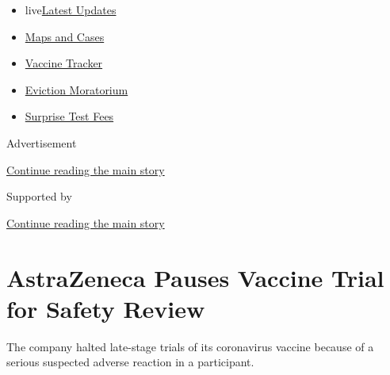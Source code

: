 \begin{itemize}
\tightlist
\item
  live\href{https://www.nytimes3xbfgragh.onion/2020/09/09/world/covid-19-coronavirus.html?name=styln-coronavirus-national\&region=TOP_BANNER\&block=storyline_menu_recirc\&action=click\&pgtype=Article\&impression_id=11ea9901-f2ae-11ea-b55f-67263e649e17\&variant=undefined}{Latest
  Updates}
\item
  \href{https://www.nytimes3xbfgragh.onion/interactive/2020/us/coronavirus-us-cases.html?name=styln-coronavirus-national\&region=TOP_BANNER\&block=storyline_menu_recirc\&action=click\&pgtype=Article\&impression_id=11eac010-f2ae-11ea-b55f-67263e649e17\&variant=undefined}{Maps
  and Cases}
\item
  \href{https://www.nytimes3xbfgragh.onion/interactive/2020/science/coronavirus-vaccine-tracker.html?name=styln-coronavirus-national\&region=TOP_BANNER\&block=storyline_menu_recirc\&action=click\&pgtype=Article\&impression_id=11eac011-f2ae-11ea-b55f-67263e649e17\&variant=undefined}{Vaccine
  Tracker}
\item
  \href{https://www.nytimes3xbfgragh.onion/2020/09/02/your-money/eviction-moratorium-covid.html?name=styln-coronavirus-national\&region=TOP_BANNER\&block=storyline_menu_recirc\&action=click\&pgtype=Article\&impression_id=11eac012-f2ae-11ea-b55f-67263e649e17\&variant=undefined}{Eviction
  Moratorium}
\item
  \href{https://www.nytimes3xbfgragh.onion/2020/09/09/upshot/coronavirus-surprise-test-fees.html?name=styln-coronavirus-national\&region=TOP_BANNER\&block=storyline_menu_recirc\&action=click\&pgtype=Article\&impression_id=11eac013-f2ae-11ea-b55f-67263e649e17\&variant=undefined}{Surprise
  Test Fees}
\end{itemize}

Advertisement

\protect\hyperlink{after-top}{Continue reading the main story}

Supported by

\protect\hyperlink{after-sponsor}{Continue reading the main story}

\hypertarget{astrazeneca-pauses-vaccine-trial-for-safety-review}{%
\section{AstraZeneca Pauses Vaccine Trial for Safety
Review}\label{astrazeneca-pauses-vaccine-trial-for-safety-review}}

The company halted late-stage trials of its coronavirus vaccine because
of a serious suspected adverse reaction in a participant.

